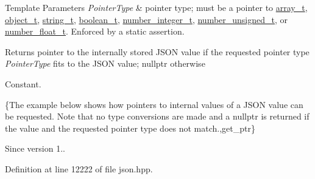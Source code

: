 \begin{DoxyTemplParams}{Template Parameters}
{\em Pointer\+Type} & pointer type; must be a pointer to \hyperlink{classnlohmann_1_1basic__json_ae095578e03df97c5b3991787f1056374}{array\+\_\+t}, \hyperlink{classnlohmann_1_1basic__json_a5e48a7893520e1314bf0c9723e26ea2a}{object\+\_\+t}, \hyperlink{classnlohmann_1_1basic__json_a61f8566a1a85a424c7266fb531dca005}{string\+\_\+t}, \hyperlink{classnlohmann_1_1basic__json_a4c919102a9b4fe0d588af64801436082}{boolean\+\_\+t}, \hyperlink{classnlohmann_1_1basic__json_a98e611d67b7bd75307de99c9358ab2dc}{number\+\_\+integer\+\_\+t}, \hyperlink{classnlohmann_1_1basic__json_ab906e29b5d83ac162e823ada2156b989}{number\+\_\+unsigned\+\_\+t}, or \hyperlink{classnlohmann_1_1basic__json_a88d6103cb3620410b35200ee8e313d97}{number\+\_\+float\+\_\+t}. Enforced by a static assertion.\\
\hline
\end{DoxyTemplParams}
\begin{DoxyReturn}{Returns}
pointer to the internally stored J\+S\+ON value if the requested pointer type {\itshape Pointer\+Type} fits to the J\+S\+ON value; {\ttfamily nullptr} otherwise
\end{DoxyReturn}
Constant.

\{The example below shows how pointers to internal values of a J\+S\+ON value can be requested. Note that no type conversions are made and a {\ttfamily nullptr} is returned if the value and the requested pointer type does not match.,get\+\_\+ptr\}

\begin{DoxySince}{Since}
version 1.. 
\end{DoxySince}


Definition at line 12222 of file json.\+hpp.


